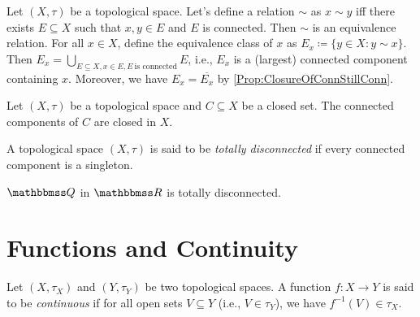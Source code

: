 \documentclass[screen,single]{techreport}
\numberwithin{equation}{section}
\begin{document}
\begin{definition}\label{De:ConnEquivalenceRelation}
	Let $(X,\tau)$ be a topological space.
	Let's define a relation ${\sim}$ as $x \sim y$ iff there exists $E \subseteq X$ such that $x,y\in E$ and $E$ is connected.
	Then ${\sim}$ is an equivalence relation.
	For all $x \in X$, define the equivalence class of $x$ as $E_x \coloneqq \{ y \in X : y \sim x \}$.
	Then $E_x = \bigcup_{E \subseteq X, x \in E, E~\text{is connected}} E$, i.e., $E_x$ is a (largest) connected component containing $x$.
	Moreover, we have $E_x = \overline{E_x}$ by \cref{Prop:ClosureOfConnStillConn}.
\end{definition}

\begin{proposition}\label{Prop:ClosedConnComponentStillClosed}
	Let $(X,\tau)$ be a topological space and $C \subseteq X$ be a closed set.
	The connected components of $C$ are closed in $X$.
\end{proposition}

\begin{definition}\label{De:TotalDisconnectedness}
	A topological space $(X,\tau)$ is said to be \emph{totally disconnected} if every connected component is a singleton.
\end{definition}

\begin{example}\label{De:QInRIsTotallyDisconn}
	$\bbQ$ in $\bbR$ is totally disconnected.
\end{example}

\section{Functions and Continuity}

\begin{definition}\label{De:ContinuousFunctions}
	Let $(X,\tau_X)$ and $(Y,\tau_Y)$ be two topological spaces.
	A function $f : X \to Y$ is said to be \emph{continuous} if for all open sets $V \subseteq Y$ (i.e., $V \in \tau_Y$), we have $f^{-1}(V) \in \tau_X$.
\end{definition}
\end{document}
